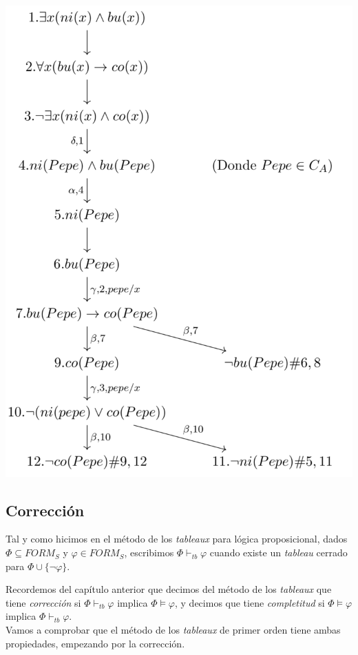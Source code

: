 \begin{example}
\begin{center}
\includegraphics[scale = 0.44]{figures/tableau4.png}
\end{center}
\end{example}


\subsection{Corrección}

Tal y como hicimos en el método de los \textit{tableaux} para lógica proposicional, dados $\Phi \subseteq FORM_S$ y $\varphi \in FORM_S$, escribimos $\Phi \vdash_{tb} \varphi$ cuando existe un \textit{tableau} cerrado para $\Phi \cup \{\neg \varphi\}$.

Recordemos del capítulo anterior que decimos del método de los \textit{tableaux} que tiene \textit{corrección} si $\Phi \vdash_{tb} \varphi$ implica $\Phi \vDash \varphi$, y decimos que tiene \textit{completitud} si $\Phi \vDash \varphi$ implica $\Phi \vdash_{tb} \varphi$.\\
Vamos a comprobar que el método de los \textit{tableaux} de primer orden tiene ambas propiedades, empezando por la corrección.

